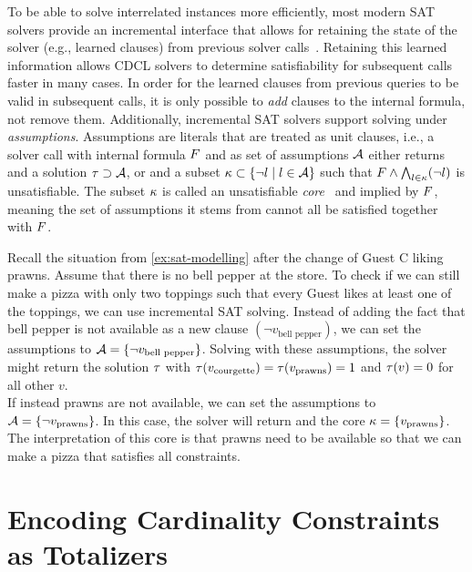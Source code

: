 To be able to solve interrelated instances more efficiently, most modern SAT solvers provide an incremental interface that allows for retaining the state of the solver (e.g., learned clauses) from previous solver calls~\autocites{DBLP:journals/entcs/EenS03,handbook2-cdcl}.
Retaining this learned information allows CDCL solvers to determine satisfiability for subsequent calls faster in many cases.
In order for the learned clauses from previous queries to be valid in subsequent calls, it is only possible to \emph{add} clauses to the internal formula, not remove them.
Additionally, incremental SAT solvers support solving under \emph{assumptions}.
Assumptions are literals that are treated as unit clauses, i.e., a solver call with internal formula $F$ and as set of assumptions $\mathcal{A}$ either returns \sat{} and a solution $\tau \supset \mathcal{A}$, or \unsat{} and a subset $\kappa \subset \{\lnot l \mid l\in\mathcal{A}\}$ such that $F \land \bigwedge_{l \in \kappa} (\lnot l)$ is unsatisfiable.
The subset $\kappa$ is called an unsatisfiable \emph{core}~\autocite{handbook2-cdcl} and implied by $F$, meaning the set of assumptions it stems from cannot all be satisfied together with $F$.

\begin{example}\label{ex:inc-sat}
  Recall the situation from \cref{ex:sat-modelling} after the change of Guest C liking prawns.
  Assume that there is no bell pepper at the store.
  To check if we can still make a pizza with only two toppings such that every Guest likes at least one of the toppings, we can use incremental SAT solving.
  Instead of adding the fact that bell pepper is not available as a new clause $(\lnot v_\text{bell pepper})$, we can set the assumptions to $\mathcal{A}=\{\lnot v_\text{bell pepper}\}$.
  Solving with these assumptions, the solver might return the solution $\tau$ with $\tau(v_\text{courgette}) = \tau(v_\text{prawns}) = 1$ and $\tau(v) = 0$ for all other $v$. \\
  If instead prawns are not available, we can set the assumptions to $\mathcal{A}=\{\lnot v_\text{prawns}\}$.
  In this case, the solver will return \unsat{} and the core $\kappa=\{v_\text{prawns}\}$.
  The interpretation of this core is that prawns need to be available so that we can make a pizza that satisfies all constraints.
\end{example}

\section{Encoding Cardinality Constraints as Totalizers\label{sec:card-const}}

